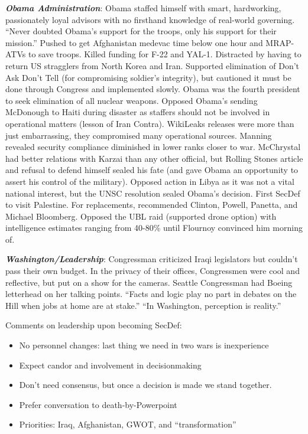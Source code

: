 \documentclass[
]{article}
\begin{document}
\textbf{\emph{Obama Administration}}: Obama staffed himself with smart,
hardworking, passionately loyal advisors with no firsthand knowledge of
real-world governing. ``Never doubted Obama's support for the troops,
only his support for their mission.'' Pushed to get Afghanistan medevac
time below one hour and MRAP-ATVs to save troops. Killed funding for
F-22 and YAL-1. Distracted by having to return US stragglers from North
Korea and Iran. Supported elimination of Don't Ask Don't Tell (for
compromising soldier's integrity), but cautioned it must be done through
Congress and implemented slowly. Obama was the fourth president to seek
elimination of all nuclear weapons. Opposed Obama's sending McDonough to
Haiti during disaster as staffers should not be involved in operational
matters (lesson of Iran Contra). WikiLeaks releases were more than just
embarrassing, they compromised many operational sources. Manning
revealed security compliance diminished in lower ranks closer to war.
McChrystal had better relations with Karzai than any other official, but
Rolling Stones article and refusal to defend himself sealed his fate
(and gave Obama an opportunity to assert his control of the military).
Opposed action in Libya as it was not a vital national interest, but the
UNSC resolution sealed Obama's decision. First SecDef to visit
Palestine. For replacements, recommended Clinton, Powell, Panetta, and
Michael Bloomberg. Opposed the UBL raid (supported drone option) with
intelligence estimates ranging from 40-80\% until Flournoy convinced him
morning of.

\textbf{\emph{Washington/Leadership}}: Congressman criticized Iraqi
legislators but couldn't pass their own budget. In the privacy of their
offices, Congressmen were cool and reflective, but put on a show for the
cameras. Seattle Congressman had Boeing letterhead on her talking
points. ``Facts and logic play no part in debates on the Hill when jobs
at home are at stake.'' ``In Washington, perception is reality.''

Comments on leadership upon becoming SecDef:

\begin{itemize}
\item
  No personnel changes: last thing we need in two wars is inexperience
\item
  Expect candor and involvement in decisionmaking
\item
  Don't need consensus, but once a decision is made we stand together.
\item
  Prefer conversation to death-by-Powerpoint
\item
  Priorities: Iraq, Afghanistan, GWOT, and ``transformation''
\end{itemize}
\end{document}

